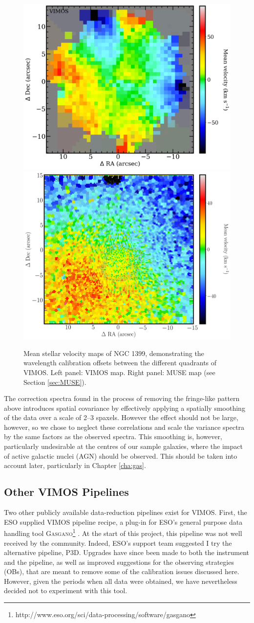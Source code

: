		\begin{figure}
			\centering
			\includegraphics[width=.4\textwidth]{chapter2/VIMOS_NGC1399_vel.png}
			\includegraphics[width=.4\textwidth]{chapter2/MUSE_NGC1399_vel.png}
			\caption[VIMOS data wavelength calibration problems]{Mean stellar velocity maps of NGC 1399, demonstrating the  wavelength calibration offsets between the different quadrants of VIMOS. Left panel: VIMOS map. Right panel: MUSE map (see Section \ref{sec:MUSE}).}
			\label{fig:egVel}
		\end{figure}

		The correction spectra found in the process of removing the fringe-like pattern above introduces spatial covariance by effectively applying a spatially smoothing of the data over a scale of 2--3 spaxels. However the effect should not be large, however, so we chose to neglect these correlations and scale the variance spectra by the same factors as the observed spectra. This smoothing is, however, particularly undesirable at the centres of our sample galaxies, where the impact of active galactic nuclei (AGN) should be observed. This should be taken into account later, particularly in Chapter \ref{cha:gas}.


	\subsection{Other VIMOS Pipelines}
		\label{subsec:Other}
		Two other publicly available data-reduction pipelines exist for VIMOS. First, the ESO supplied VIMOS pipeline recipe, a plug-in for ESO's general purpose data handling tool \textsc{Gasgano}\footnote{http://www.eso.org/sci/data-processing/software/gasgano} \citep{Izzo2004, ESO2012}. At the start of this project, this pipeline was not well received by the community. Indeed, ESO's support team suggested I try the alternative pipeline, \textsc{P3D}. Upgrades have since been made to both the instrument and the pipeline, as well as improved suggestions for the observing strategies (OBs), that are meant to remove some of the calibration issues discussed here. However, given the periods when all data were obtained, we have nevertheless decided not to experiment with this tool.
		
